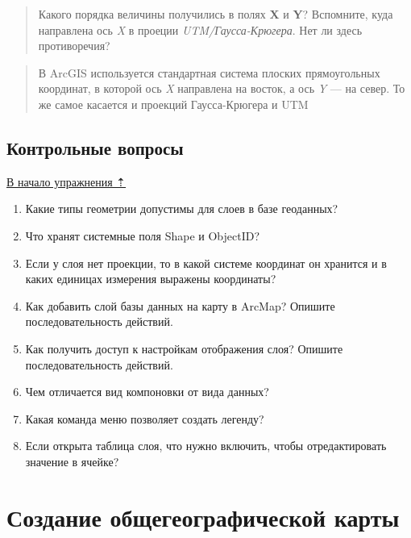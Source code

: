 \documentclass[]{book}
\theoremstyle{definition}
\theoremstyle{definition}
\theoremstyle{definition}
\theoremstyle{remark}
\begin{document}
\begin{enumerate}
  \begin{quote}
  Какого порядка величины получились в полях \textbf{X} и \textbf{Y}?
  Вспомните, куда направлена ось \emph{X} в проеции
  \emph{UTM/Гаусса-Крюгера}. Нет ли здесь противоречия?
  \end{quote}

  \begin{quote}
  В ArcGIS используется стандартная система плоских прямоугольных
  координат, в которой ось \emph{X} направлена на восток, а ось \emph{Y}
  --- на север. То же самое касается и проекций Гаусса-Крюгера и UTM
  \end{quote}
\end{enumerate}

\hypertarget{map-design-quaternary-questions}{%
\section{Контрольные вопросы}\label{map-design-quaternary-questions}}

\protect\hyperlink{map-design-quaternary}{В начало упражнения ⇡}

\begin{enumerate}
\def\labelenumi{\arabic{enumi}.}
\item
  Какие типы геометрии допустимы для слоев в базе геоданных?
\item
  Что хранят системные поля Shape и ObjectID?
\item
  Если у слоя нет проекции, то в какой системе координат он хранится и в
  каких единицах измерения выражены координаты?
\item
  Как добавить слой базы данных на карту в ArcMap? Опишите
  последовательность действий.
\item
  Как получить доступ к настройкам отображения слоя? Опишите
  последовательность действий.
\item
  Чем отличается вид компоновки от вида данных?
\item
  Какая команда меню позволяет создать легенду?
\item
  Если открыта таблица слоя, что нужно включить, чтобы отредактировать
  значение в ячейке?
\end{enumerate}

\hypertarget{map-design-general}{%
\chapter{Создание общегеографической карты}\label{map-design-general}}
\end{document}
